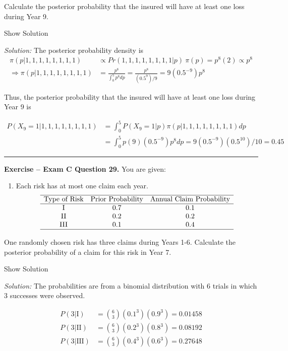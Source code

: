 \documentclass[]{book}
\providecommand{\tightlist}{%
  \setlength{\itemsep}{0pt}\setlength{\parskip}{0pt}}
\theoremstyle{definition}
\theoremstyle{definition}
\theoremstyle{definition}
\theoremstyle{remark}
\begin{document}
Calculate the posterior probability that the insured will have at least
one loss during Year 9.

Show Solution

\hypertarget{toggleExamC15}{}
\emph{Solution:} The posterior probability density is \[\begin{aligned}
\pi(p|1,1,1,1,1,1,1,1) &\propto Pr(1,1,1,1,1,1,1,1|p)\ \pi(p) = p^8(2) \propto p^8 \\ 
\Rightarrow \pi(p|1,1,1,1,1,1,1,1) &= \frac{p^8}{\int_0^5 p^8 dp} = \frac{p^8}{(0.5^9)/9} = 9(0.5^{-9})p^8
\end{aligned}\]

Thus, the posterior probability that the insured will have at least one
loss during Year 9 is

\[\begin{aligned}
P(X_9=1|1,1,1,1,1,1,1,1) &= \int_0^5 P(X_9=1|p) \pi(p|1,1,1,1,1,1,1,1) dp \\
&= \int_0^5 p(9)(0.5^{-9})p^8 dp = 9(0.5^{-9})(0.5^{10})/10 = 0.45
\end{aligned}\]

\begin{center}\rule{0.5\linewidth}{\linethickness}\end{center}

\textbf{Exercise -- Exam C Question 29.} You are given:

\begin{enumerate}
\def\labelenumi{(\roman{enumi})}
\tightlist
\item
  Each risk has at most one claim each year. \[\begin{array}{ccc}
  \hline
  \text{Type of Risk} & \text{Prior Probability} & \text{Annual Claim Probability} \\
  \hline
  \text{I} & 0.7 & 0.1 \\
  \text{II} & 0.2 & 0.2 \\
  \text{III} & 0.1 & 0.4 \\ 
  \hline
  \end{array}\]
\end{enumerate}

One randomly chosen risk has three claims during Years 1-6. Calculate
the posterior probability of a claim for this risk in Year 7.

Show Solution

\hypertarget{toggleExamC29}{}
\emph{Solution:} The probabilities are from a binomial distribution with
6 trials in which 3 successes were observed.

\[\begin{aligned} 
P(3|\text{I}) &= {6 \choose 3} (0.1^3)(0.9^3) = 0.01458 \\
P(3|\text{II}) &= {6 \choose 3} (0.2^3)(0.8^3) = 0.08192 \\
P(3|\text{III}) &= {6 \choose 3} (0.4^3)(0.6^3) = 0.27648
\end{aligned}\]
\end{document}
